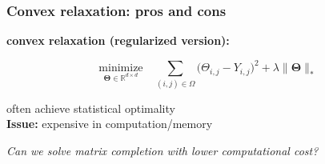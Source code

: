 \documentclass[compress,
mathserif,wide,%
]{beamer}
\begin{document}
\begin{frame}
\frametitle{Convex relaxation: pros and cons}


  {

\begin{varblock}[\textwidth]{}
\textbf{convex relaxation (regularized version):}
  \vspace{-2em}
\begin{center}
\[
   \underset{\bm{\Theta}\in\mathbb{R}^{d\times d}}{\text{minimize}}\quad  \sum_{(i,j)\in\Omega}\big(\Theta_{i,j}-Y_{i,j}\big)^{2}  +\lambda{\|\bm{\Theta}\|_{*}}
\]  
\end{center}
\end{varblock}
}

{
\vfill
\vspace{1em}

\begin{varblock}[\textwidth]{}
\centering
     often achieve statistical optimality \\ \pause
   \alert{{\bf Issue: }}  expensive in computation/memory
\end{varblock}
}

\end{frame}



\begin{frame}[plain]
  
\vfill

\centering
  {\Large\em Can we solve matrix completion with lower computational cost?}
  
\vfill

\end{frame}
\end{document}
